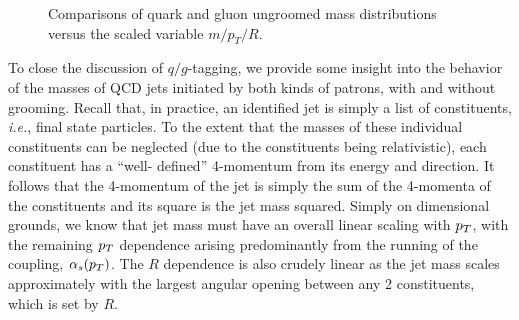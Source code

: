 \begin{figure}
\centering
{}
\caption{Comparisons of quark and gluon ungroomed mass distributions versus the scaled variable $m/p_T/R$. }
\label{fig:qg_masses_log}
\end{figure}

To close the discussion of $q/g$-tagging, we provide some insight into the behavior of the masses of QCD jets initiated by both kinds of patrons,
 with and without grooming.  Recall that, in practice, an
identified jet is simply a list of constituents, \textit{i.e.}, final
state particles.  To the extent
that the masses of these individual constituents can be neglected (due to the constituents being relativistic), each constituent has a ``well-
defined'' 4-momentum from its energy and direction.  It follows that the 4-momentum of the jet  is simply the sum of the 4-momenta of the constituents and its square is the jet mass squared.
Simply on dimensional grounds,
we know that jet mass must have an overall linear scaling with $p_T$, with the remaining $p_T$ dependence arising predominantly from the running of the coupling,
$\alpha_s(p_T)$.  The $R$ dependence is also crudely linear as the jet mass scales approximately with the largest angular opening between any 2 constituents,
which is set by $R$.

